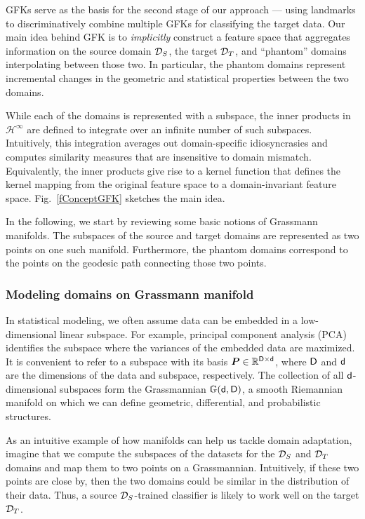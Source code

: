 GFKs serve as the basis for the second stage of our approach --- using landmarks to discriminatively combine multiple GFKs for classifying the target data. Our main idea behind GFK is to {\em implicitly} construct  a feature space that aggregates information on the source domain $ \mathcal{D}_{S}$, the target $\mathcal{D}_{T}$, and ``phantom'' domains interpolating between those two. In particular, the phantom domains represent incremental changes in the geometric and statistical properties between the two domains.

While each of the domains is represented with a subspace, the inner products in $\mathcal{H}^\infty$ are defined to integrate over an infinite number of such subspaces. Intuitively, this integration averages out domain-specific idiosyncrasies and computes similarity measures that are insensitive to domain mismatch. Equivalently, the inner products give rise to a kernel function that defines the kernel mapping from the original feature space to a domain-invariant feature space. Fig.~\ref{fConceptGFK} sketches the main idea.

In the following, we start by reviewing some basic notions of Grassmann manifolds. The subspaces of the source and target domains are represented as two points on one such manifold.  Furthermore, the phantom domains correspond to the points on the geodesic path connecting those two points. 

\subsubsection{Modeling domains on Grassmann manifold}
In statistical modeling, we often assume data can be embedded in a
low-dimensional linear subspace. For example, principal component
analysis (PCA) identifies the subspace where the variances of the
embedded data are maximized. It is convenient to refer to a subspace with its  basis $\boldsymbol{P}\in
\mathbb{R}^{\mathsf{D}\times \mathsf{d}}$, where $\mathsf{D}$ and $\mathsf{d}$ are the dimensions of the data and subspace, respectively.    The collection of all $\mathsf{d}$-dimensional
subspaces form the Grassmannian $\mathbb{G}(\mathsf{d},\mathsf{D})$, a
smooth Riemannian manifold on which we can define  geometric, differential, and probabilistic structures.

As an intuitive example of how manifolds can help us tackle domain adaptation, imagine that we compute the subspaces of the datasets for the $ \mathcal{D}_{S}$ and $\mathcal{D}_{T}$ domains and map them to two points on a Grassmannian.  Intuitively, if these two points are close by, then the two domains could be similar in the distribution of their data. Thus, a source $\mathcal{D}_{S}$-trained classifier is likely to work well on the target $\mathcal{D}_{T}$.

